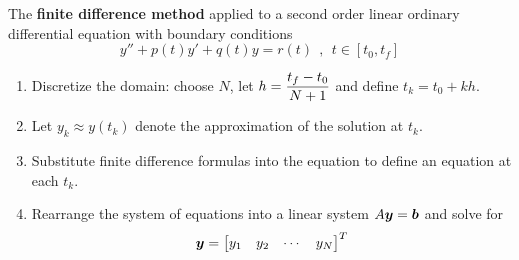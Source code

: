 \begin{definition}
The {\bf finite difference method} applied to a second order linear ordinary differential equation with boundary conditions 
$$
y'' + p(t)y' + q(t)y = r(t) \ \ , \ \ t \in [t_0,t_f]
$$
\begin{enumerate}
\item Discretize the domain: choose $N$, let $\displaystyle h = \frac{t_f - t_0}{N+1}$ and define $t_k = t_0 + kh$.
\item Let $y_k \approx y(t_k)$ denote the approximation of the solution at $t_k$.
\item Substitute finite difference formulas into the equation to define an equation at each $t_k$.
\item Rearrange the system of equations into a linear system $A \boldsymbol{y} = \boldsymbol{b}$ and solve for
$$
\boldsymbol{y} = \begin{bmatrix} y_1 & y_2 & \cdots & y_N \end{bmatrix}^T
$$
\end{enumerate}
\end{definition}

